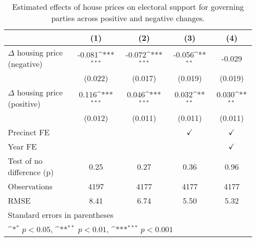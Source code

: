 \begin{table}[htbp]\centering
\def\sym#1{\ifmmode^{#1}\else\(^{#1}\)\fi}
\caption{Estimated effects of house prices on electoral support for governing parties across positive and negative changes.} \label{preposneg}
\begin{tabular}{l*{4}{c}}
\hline\hline
                    &\multicolumn{1}{c}{(1)}         &\multicolumn{1}{c}{(2)}         &\multicolumn{1}{c}{(3)}         &\multicolumn{1}{c}{(4)}         \\
\hline
$\Delta$ housing price (negative)&      -0.081\sym{***}&      -0.072\sym{***}&      -0.056\sym{**} &      -0.029         \\
                    &     (0.022)         &     (0.017)         &     (0.019)         &     (0.019)         \\
[1em]
$\Delta$ housing price (positive)&       0.116\sym{***}&       0.046\sym{***}&       0.032\sym{**} &       0.030\sym{**} \\
                    &     (0.012)         &     (0.011)         &     (0.011)         &     (0.011)         \\
[1em]
\hline Precinct FE  &                     &                     &$\checkmark$         &$\checkmark$         \\
[1em]
Year FE             &                     &                     &                     &$\checkmark$         \\
\hline
Test of no difference (p)&        0.25         &        0.27         &        0.36         &        0.96         \\
Observations        &        4197         &        4177         &        4177         &        4177         \\
RMSE                &        8.41         &        6.74         &        5.50         &        5.32         \\
\hline\hline
\multicolumn{5}{l}{\footnotesize Standard errors in parentheses}\\
\multicolumn{5}{l}{\footnotesize \sym{*} \(p<0.05\), \sym{**} \(p<0.01\), \sym{***} \(p<0.001\)}\\
\end{tabular}
\end{table}
